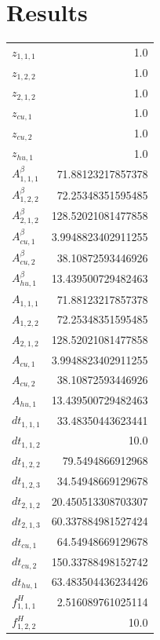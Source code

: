 \documentclass{article}%
\makeatletter
\let\mcnewpage=\newpage%
\newcommand{\TrickSupertabularIntoMulticols}{%
\renewcommand\newpage{%
\if@firstcolumn%
\hrule width\linewidth height0pt%
\columnbreak%
\else%
\mcnewpage%
\fi%
}%
}%
\makeatother
\begin{document}
\section{Results}%
\thispagestyle{plain}%
\begin{multicols*}{3}%
\TrickSupertabularIntoMulticols%
%
\begin{supertabular}{lr}%
	$z_{1,1,1}$ & 1.0 \\%
	$z_{1,2,2}$ & 1.0 \\%
	$z_{2,1,2}$ & 1.0 \\%
	$z_{cu,1}$ & 1.0 \\%
	$z_{cu,2}$ & 1.0 \\%
	$z_{hu,1}$ & 1.0 \\%
	$A_{1,1,1}^{\beta}$ & 71.88123217857378 \\%
	$A_{1,2,2}^{\beta}$ & 72.25348351595485 \\%
	$A_{2,1,2}^{\beta}$ & 128.52021081477858 \\%
	$A_{cu,1}^{\beta}$ & 3.9948823402911255 \\%
	$A_{cu,2}^{\beta}$ & 38.10872593446926 \\%
	$A_{hu,1}^{\beta}$ & 13.439500729482463 \\%
	$A_{1,1,1}$ & 71.88123217857378 \\%
	$A_{1,2,2}$ & 72.25348351595485 \\%
	$A_{2,1,2}$ & 128.52021081477858 \\%
	$A_{cu,1}$ & 3.9948823402911255 \\%
	$A_{cu,2}$ & 38.10872593446926 \\%
	$A_{hu,1}$ & 13.439500729482463 \\%
	$dt_{1,1,1}$ & 33.48350443623441 \\%
	$dt_{1,1,2}$ & 10.0 \\%
	$dt_{1,2,2}$ & 79.5494866912968 \\%
	$dt_{1,2,3}$ & 34.54948669129678 \\%
	$dt_{2,1,2}$ & 20.450513308703307 \\%
	$dt_{2,1,3}$ & 60.337884981527424 \\%
	$dt_{cu,1}$ & 64.54948669129678 \\%
	$dt_{cu,2}$ & 150.33788498152742 \\%
	$dt_{hu,1}$ & 63.483504436234426 \\%
	$f_{1,1,1}^{H}$ & 2.516089761025114 \\%
	$f_{1,2,2}^{H}$ & 10.0 \\%

\end{supertabular}
\end{multicols*}
\end{document}
